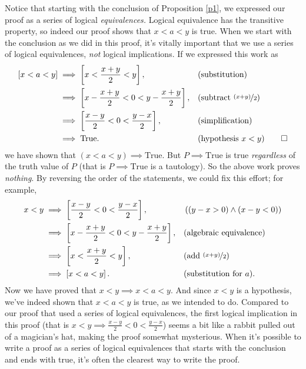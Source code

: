 \documentclass[12pt,fleqn,answers]{article}
\newcommand{\true}{\mathrm{True}}
\begin{document}
Notice that starting with the conclusion of Proposition \ref{p1}, we expressed our proof as a series of logical \emph{equivalences.}  Logical
equivalence has the transitive property, so indeed our proof shows that $x < a < y$ is true.  
When we start with the conclusion as we did in this proof, it's vitally important that we use a series of  logical equivalences, \emph{not}
logical implications. If we expressed this work as
 \begin{align*}
      \left[ x < a < y \right] 
          &\implies \left[ x < \frac{x+y}{2} < y \right], &&\text{(substitution)} \\
          & \implies  \left[ x - \frac{x+y}{2} < 0 < y - \frac{x+y}{2}  \right], &&\text{(subtract $\nicefrac{(x+y)}{2}$)} \\
          & \implies  \left[ \frac{x-y}{2} < 0 < \frac{y-x}{2}  \right], &&\text{(simplification)} \\
          & \implies \true. && \text{(hypothesis $x < y$)} \qedhere
    \end{align*} 
we have shown that  $(x < a < y) \implies \true$. But $P \implies \true$ is
true \emph{regardless} of the truth value of $P$ (that is $P \implies \true$ is a 
tautology). So the above work proves \emph{nothing}. By reversing the order of the statements,
we could fix this effort; for example,
 \begin{align*}
    x < y  &\implies  \left[ \frac{x-y}{2} < 0 < \frac{y-x}{2}  \right], && \left((y-x > 0) \land  (x-y < 0) \right) \\
             &\implies   \left[ x - \frac{x+y}{2} < 0 < y - \frac{x+y}{2}  \right], &&\text{(algebraic equivalence)} \\
             &\implies \left[ x < \frac{x+y}{2} < y  \right], &&\text{(add $\nicefrac{(x+y)}{2}$)} \\
             &\implies \left[ x < a < y  \right].  &&\text{(substitution for $a$)}.
 \end{align*} 
Now we have proved that $x < y \implies x < a < y  $. And since $x < y$ is a hypothesis, we've indeed shown that $ x < a < y $ is true,
as we intended to do. Compared to our proof that used a series of logical equivalences,  the first logical implication in this proof 
(that is $x < y \implies 
 \frac{x-y}{2} < 0 < \frac{y-x}{2} $) seems a bit like a rabbit pulled out of a magician's hat, making the proof somewhat mysterious.
 When it's possible to write a proof as a series of logical equivalences that starts with the conclusion and ends with true, it's often 
 the clearest way to write the proof. 
\end{document}
